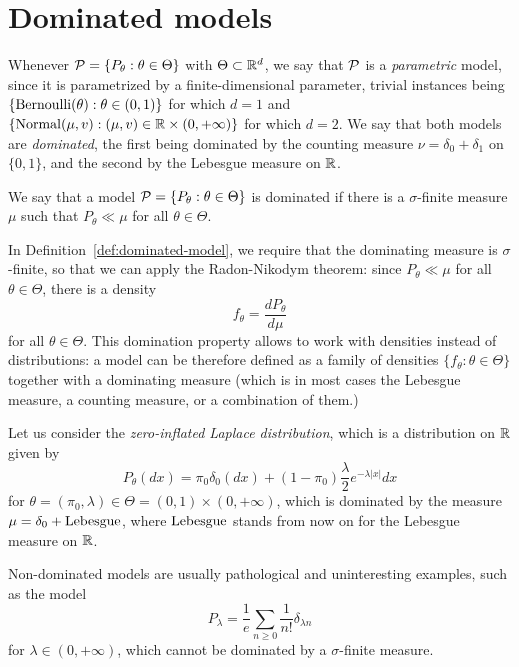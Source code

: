 \section{Dominated models} 

Whenever $\operatorname{\mathcal P} = \{ P_\theta : \theta \in \Theta \}$ with $\Theta \subset \mathbb R^d$, we say that $\operatorname{\mathcal P}$ is a \emph{parametric} model, since it is parametrized by a finite-dimensional parameter, trivial instances being $\{ \operatorname{Bernoulli}(\theta) : \theta \in (0, 1) \}$ for which $d=1$ and $\{ \operatorname{Normal}(\mu, v) : (\mu, v) \in \mathbb R \times (0, +\infty) \}$ for which $d=2$.
We say that both models are \emph{dominated}, the first being dominated by the counting measure $\nu = \delta_0 + \delta_1$ on $\{ 0, 1\}$,%
%
and the second by the Lebesgue measure on $\mathbb R$.
\begin{definition}
	\label{def:dominated-model}
	We say that a model $\operatorname{\mathcal P} = \{ P_\theta : \theta \in \Theta \}$ is dominated if there is a $\sigma$-finite measure $\mu$ such that $P_\theta \ll \mu$ for all $\theta \in \Theta$.
\end{definition}
In Definition~\ref{def:dominated-model}, we require that the dominating measure is $\sigma$-finite, so that we can apply the Radon-Nikodym theorem: since $P_\theta \ll \mu$ for all $\theta \in \Theta$, there is a density 
\begin{equation*}
	f_\theta = \frac{dP_\theta}{d\mu}
\end{equation*}
for all $\theta \in \Theta$.
This domination property allows to work with densities instead of distributions: a model can be therefore defined as a family of densities $\{ f_\theta : \theta \in \Theta \}$ together with a dominating measure (which is in most cases the Lebesgue measure, a counting measure, or a combination of them.)
\begin{example}
	Let us consider the \emph{zero-inflated Laplace distribution}, which is a distribution on $\mathbb R$ given by
	\begin{equation*}
		P_\theta(dx) = \pi_0 \delta_0(dx) + (1 - \pi_0) \frac{\lambda}{2} e^{-\lambda |x|} dx
	\end{equation*}
	for $\theta = (\pi_0, \lambda) \in \Theta = (0, 1) \times (0, +\infty)$, which is dominated by the measure $\mu = \delta_0 + \operatorname{Lebesgue}$, where $\operatorname{Lebesgue}$ stands from now on for the Lebesgue measure on $\mathbb R$.
\end{example}
Non-dominated models are usually pathological and uninteresting examples, such as the model
\begin{equation*}
	P_\lambda = \frac 1e \sum_{n \geq 0} \frac{1}{n!} \delta_{\lambda n}
\end{equation*}
for $\lambda \in (0, +\infty)$, which cannot be dominated by a $\sigma$-finite measure.

